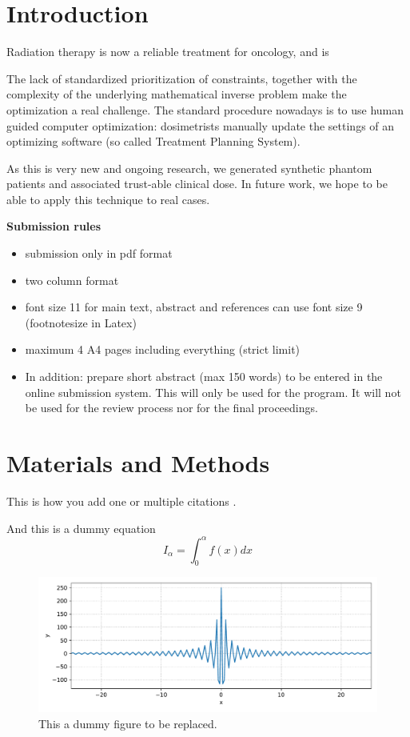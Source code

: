\section{Introduction}

Radiation therapy is now a reliable treatment for oncology, and is 

The lack of standardized prioritization of constraints, together with the complexity of the underlying mathematical inverse problem make the optimization a real challenge.
The standard procedure nowadays is to use human guided computer optimization: dosimetrists manually update the settings of an optimizing software (so called Treatment Planning System).


As this is very new and ongoing research, we generated synthetic phantom patients and associated trust-able clinical dose.
In future work, we hope to be able to apply this technique to real cases.


\textbf{\color{red}Submission rules}
\begin{itemize}
\color{red}
\item submission only in pdf format
\item two column format
\item font size 11 for main text, abstract and references can use font size 9 (footnotesize in Latex)
\item maximum 4 A4 pages including everything (strict limit)
\item In addition: prepare short abstract (max 150 words) to be entered in the online submission system. 
      This will only be used for the program. 
      It will not be used for the review process nor for the final proceedings.
\end{itemize}

\lipsum[2-5]


\section{Materials and Methods}

This is how you add one \cite{Pivot2023} or multiple citations \cite{Saporta2022,Robert2022}.

And this is a dummy equation
\begin{equation}
I_\alpha = \int_0^\alpha f(x) dx
\end{equation}

\begin{figure}
  \centering
  \includegraphics[width=1.0\textwidth]{./fig1.pdf}
  \caption{This a dummy figure to be replaced.}
  \label{fig:dummyfigure}
\end{figure}

